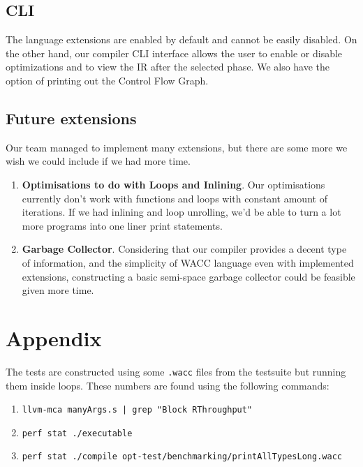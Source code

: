 \documentclass[11pt,a4paper]{article}
\begin{document}
\subsection{CLI}
The language extensions are enabled by default and cannot be easily disabled. On the other hand, our compiler CLI interface allows the user to enable or disable optimizations and to view the IR after the selected phase. We also have the option of printing out the Control Flow Graph.

\subsection{Future extensions}

Our team managed to implement many extensions, but there are some more we wish we could include if we had more time.

\begin{enumerate}
    \item \textbf{Optimisations to do with Loops and Inlining}. Our optimisations currently don't work with functions and loops with constant amount of iterations. If we had inlining and loop unrolling, we'd be able to turn a lot more programs into one liner print statements.
    \item \textbf{Garbage Collector}. Considering that our compiler provides a decent type of information, and the simplicity of WACC language even with implemented extensions, constructing a basic semi-space garbage collector could be feasible given more time.
\end{enumerate}

\section{Appendix}
The tests are constructed using some \texttt{.wacc} files from the testsuite but running them inside loops. These numbers are found using the following commands:
\begin{enumerate}
    \item \texttt{llvm-mca manyArgs.s | grep "Block RThroughput"}
    \item \texttt{perf stat ./executable}
    \item \texttt{perf stat ./compile opt-test/benchmarking/printAllTypesLong.wacc}
\end{enumerate}
\end{document}
